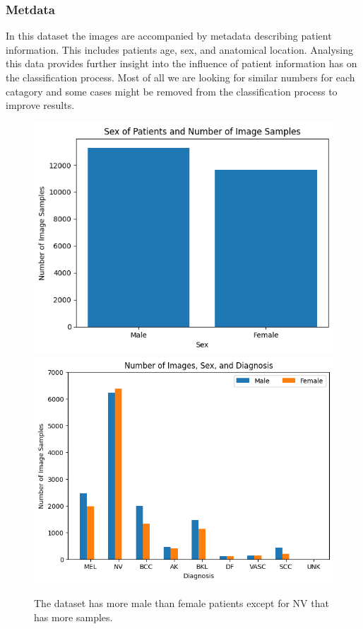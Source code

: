 \subsubsection{Metdata}
In this dataset the images are accompanied by metadata describing patient information. This includes patients age, sex, and anatomical location. Analysing this data provides further insight into the influence of patient information has on the classification process. Most of all we are looking for similar numbers for each catagory and some cases might be removed from the classification process to improve results.

\begin{figure}
	\centering
	\includegraphics[scale=0.8]{images/ISIC/sex-number.png}
	\includegraphics[scale=0.8]{images/ISIC/number-sex-diagnosis.png}
	\caption{The dataset has more male than female patients except for NV that has more samples.} 
\end{figure} \label{sex}


